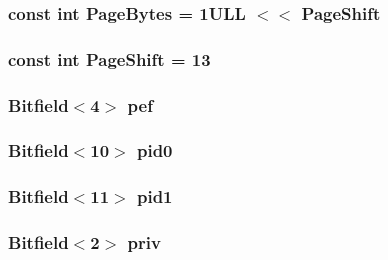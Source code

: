 \label{namespaceSparcISA_abb8b7685b079953e35015543262458e2}
\hypertarget{namespaceSparcISA_a7a804a2139c455999786dede70a4467b}{
\subsubsection[{PageBytes}]{\setlength{\rightskip}{0pt plus 5cm}const int {\bf PageBytes} = 1ULL $<$$<$ PageShift}}
\label{namespaceSparcISA_a7a804a2139c455999786dede70a4467b}
\hypertarget{namespaceSparcISA_a500ead3838797254da115aeeff14aaa5}{
\subsubsection[{PageShift}]{\setlength{\rightskip}{0pt plus 5cm}const int {\bf PageShift} = 13}}
\label{namespaceSparcISA_a500ead3838797254da115aeeff14aaa5}
\hypertarget{namespaceSparcISA_a203c6c0050f595284b99708df75ea6e4}{
\subsubsection[{pef}]{\setlength{\rightskip}{0pt plus 5cm}Bitfield$<$4$>$ {\bf pef}}}
\label{namespaceSparcISA_a203c6c0050f595284b99708df75ea6e4}
\hypertarget{namespaceSparcISA_a3ce7de5d72770e56d45a875d8dbd0bed}{
\subsubsection[{pid0}]{\setlength{\rightskip}{0pt plus 5cm}Bitfield$<$10$>$ {\bf pid0}}}
\label{namespaceSparcISA_a3ce7de5d72770e56d45a875d8dbd0bed}
\hypertarget{namespaceSparcISA_a806649f8125578a308f65fe50d13ffdc}{
\subsubsection[{pid1}]{\setlength{\rightskip}{0pt plus 5cm}Bitfield$<$11$>$ {\bf pid1}}}
\label{namespaceSparcISA_a806649f8125578a308f65fe50d13ffdc}
\hypertarget{namespaceSparcISA_a9d8b751eeaa798163459309b2f3d0b80}{
\subsubsection[{priv}]{\setlength{\rightskip}{0pt plus 5cm}Bitfield$<$2$>$ {\bf priv}}}
